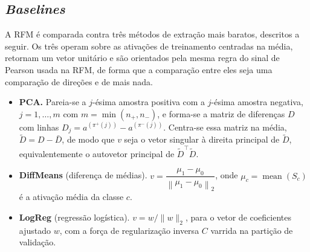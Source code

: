 \subsection{\textit{Baselines}}

A RFM é comparada contra três métodos de extração mais baratos, descritos a seguir. Os
três operam sobre as ativações de treinamento centradas na média, retornam um vetor
unitário e são orientados pela mesma regra do sinal de Pearson usada na RFM, de forma que
a comparação entre eles seja uma comparação de direções e de mais nada.

\begin{itemize}
  \item \textbf{PCA.} Pareia-se a $j$-ésima amostra positiva com a $j$-ésima amostra
  negativa, $j = 1, \dots, m$ com $m = \min(n_+, n_-)$, e forma-se a matriz de diferenças
  $D$ com linhas $D_j = a^{(\pi^+(j))} - a^{(\pi^-(j))}$. Centra-se essa matriz na média,
  $\tilde{D} = D - \bar{D}$, de modo que $v$ seja o vetor singular à direita principal de
  $\tilde{D}$, equivalentemente o autovetor principal de $\tilde{D}^{\top}\tilde{D}$.

  \item \textbf{DiffMeans} (diferença de médias).
  $v = \dfrac{\mu_1 - \mu_0}{\left\|\mu_1 - \mu_0\right\|_2}$, onde
  $\mu_c = \operatorname{mean}(S_c)$ é a ativação média da classe $c$.

  \item \textbf{LogReg} (regressão logística). $v = w / \|w\|_2$, para o vetor de coeficientes
  ajustado $w$, com a força de regularização inversa $C$ varrida na partição de validação.
\end{itemize}
